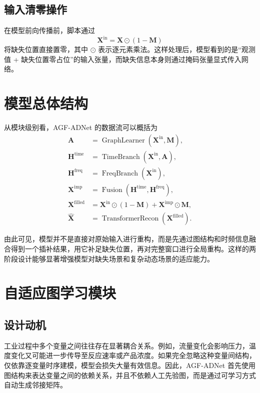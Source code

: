 \subsection{输入清零操作}

在模型前向传播前，脚本通过
\begin{equation}
    \mathbf{X}^{\mathrm{in}} = \mathbf{X} \odot (1 - \mathbf{M})
\end{equation}
将缺失位置直接置零，其中 $\odot$ 表示逐元素乘法。这样处理后，模型看到的是“观测值 + 缺失位置零占位”的输入张量，而缺失信息本身则通过掩码张量显式传入网络。

\section{模型总体结构}

从模块级别看，AGF-ADNet 的数据流可以概括为
\begin{align}
    \mathbf{A} &= \operatorname{GraphLearner}(\mathbf{X}^{\mathrm{in}}, \mathbf{M}), \\
    \mathbf{H}^{\mathrm{time}} &= \operatorname{TimeBranch}(\mathbf{X}^{\mathrm{in}}, \mathbf{A}), \\
    \mathbf{H}^{\mathrm{freq}} &= \operatorname{FreqBranch}(\mathbf{X}^{\mathrm{in}}), \\
    \mathbf{X}^{\mathrm{imp}} &= \operatorname{Fusion}(\mathbf{H}^{\mathrm{time}}, \mathbf{H}^{\mathrm{freq}}), \\
    \mathbf{X}^{\mathrm{filled}} &= \mathbf{X}^{\mathrm{in}} \odot (1-\mathbf{M}) + \mathbf{X}^{\mathrm{imp}} \odot \mathbf{M}, \\
    \hat{\mathbf{X}} &= \operatorname{TransformerRecon}(\mathbf{X}^{\mathrm{filled}}).
\end{align}

由此可见，模型并不是直接对原始输入进行重构，而是先通过图结构和时频信息融合得到一个插补结果，用它补足缺失位置，再对完整窗口进行全局重构。这样的两阶段设计能够显著增强模型对缺失场景和复杂动态场景的适应能力。

\section{自适应图学习模块}

\subsection{设计动机}

工业过程中多个变量之间往往存在显著耦合关系。例如，流量变化会影响压力，温度变化又可能进一步传导至反应速率或产品浓度。如果完全忽略这种变量间结构，仅依靠逐变量时序建模，模型会损失大量有效信息。因此，AGF-ADNet 首先使用图结构来表达变量之间的依赖关系，并且不依赖人工先验图，而是通过可学习方式自动生成邻接矩阵。

